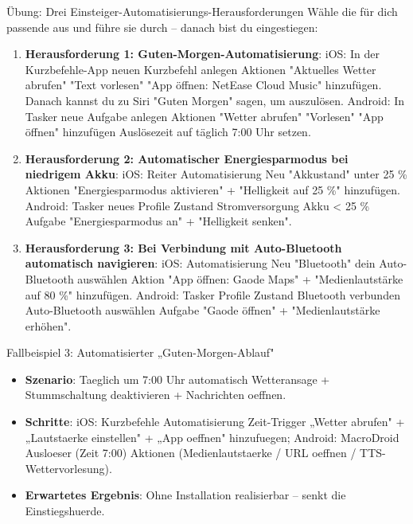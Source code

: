 \begin{tcbpractice}{Übung: Drei Einsteiger-Automatisierungs-Herausforderungen}
Wähle die für dich passende aus und führe sie durch – danach bist du eingestiegen:

\begin{enumerate}
  \item \textbf{Herausforderung 1: Guten-Morgen-Automatisierung}: iOS: In der Kurzbefehle-App neuen Kurzbefehl anlegen Aktionen "Aktuelles Wetter abrufen" "Text vorlesen" "App öffnen: NetEase Cloud Music" hinzufügen. Danach kannst du zu Siri "Guten Morgen" sagen, um auszulösen. Android: In Tasker neue Aufgabe anlegen Aktionen "Wetter abrufen" "Vorlesen" "App öffnen" hinzufügen Auslösezeit auf täglich 7:00 Uhr setzen.
  \item \textbf{Herausforderung 2: Automatischer Energiesparmodus bei niedrigem Akku}: iOS: Reiter Automatisierung Neu "Akkustand" unter 25 \% Aktionen "Energiesparmodus aktivieren" + "Helligkeit auf 25 \%" hinzufügen. Android: Tasker neues Profile Zustand Stromversorgung Akku < 25 \% Aufgabe "Energiesparmodus an" + "Helligkeit senken".
  \item \textbf{Herausforderung 3: Bei Verbindung mit Auto-Bluetooth automatisch navigieren}: iOS: Automatisierung Neu "Bluetooth" dein Auto-Bluetooth auswählen Aktion "App öffnen: Gaode Maps" + "Medienlautstärke auf 80 \%" hinzufügen. Android: Tasker Profile Zustand Bluetooth verbunden Auto-Bluetooth auswählen Aufgabe "Gaode öffnen" + "Medienlautstärke erhöhen".
\end{enumerate}

\end{tcbpractice}

\begin{tcbinfo}{Fallbeispiel 3: Automatisierter „Guten-Morgen-Ablauf"}
\begin{itemize}
  \item \textbf{Szenario}: Taeglich um 7:00 Uhr automatisch Wetteransage + Stummschaltung deaktivieren + Nachrichten oeffnen.
  \item \textbf{Schritte}: iOS: Kurzbefehle Automatisierung Zeit-Trigger „Wetter abrufen" + „Lautstaerke einstellen" + „App oeffnen" hinzufuegen; Android: MacroDroid Ausloeser (Zeit 7:00) Aktionen (Medienlautstaerke / URL oeffnen / TTS-Wettervorlesung).
  \item \textbf{Erwartetes Ergebnis}: Ohne Installation realisierbar – senkt die Einstiegshuerde.
\end{itemize}

\end{tcbinfo}
